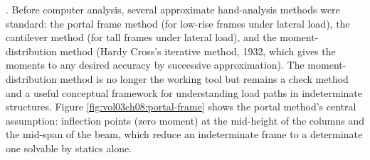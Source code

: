 

. Before computer analysis,
several approximate hand-analysis methods were standard: the
portal frame method (for low-rise frames under lateral load), the
cantilever method (for tall frames under lateral load), and the
moment-distribution method (Hardy Cross's iterative method, 1932,
which gives the moments to any desired accuracy by successive
approximation). The moment-distribution method is no longer the
working tool but remains a check method and a useful conceptual
framework for understanding load paths in indeterminate structures.
Figure \ref{fig:vol03ch08:portal-frame} shows the portal method's
central assumption: inflection points (zero moment) at the mid-height
of the columns and the mid-span of the beam, which reduce an
indeterminate frame to a determinate one solvable by statics alone.

